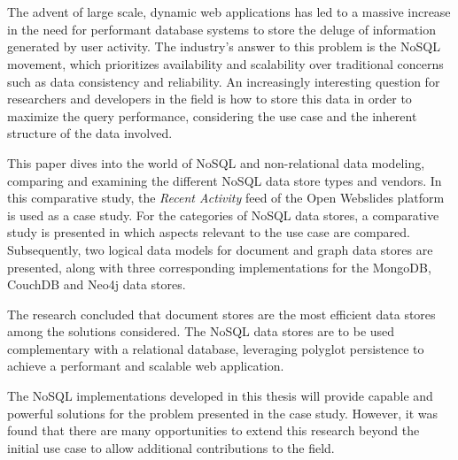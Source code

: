 \chapter*{}

The advent of large scale, dynamic web applications has led to a massive increase in the need for performant database systems to store the deluge of information generated by user activity.
The industry's answer to this problem is the NoSQL movement, which prioritizes availability and scalability over traditional concerns such as data consistency and reliability.
An increasingly interesting question for researchers and developers in the field is how to store this data in order to maximize the query performance, considering the use case and the inherent structure of the data involved.

This paper dives into the world of NoSQL and non-relational data modeling, comparing and examining the different NoSQL data store types and vendors.
In this comparative study, the \textit{Recent Activity} feed of the Open Webslides platform is used as a case study.
For the  categories of NoSQL data stores, a comparative study is presented in which aspects relevant to the use case are compared.
Subsequently, two logical data models for document and graph data stores are presented, along with three corresponding implementations for the MongoDB, CouchDB and Neo4j data stores.

The research concluded that document stores are the most efficient data stores among the solutions considered.
The NoSQL data stores are to be used complementary with a relational database, leveraging polyglot persistence to achieve a performant and scalable web application.

The NoSQL implementations developed in this thesis will provide capable and powerful solutions for the problem presented in the case study.
However, it was found that there are many opportunities to extend this research beyond the initial use case to allow additional contributions to the field.

